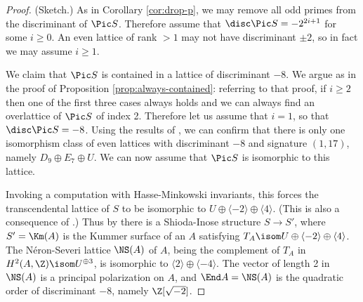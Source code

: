 \documentclass{article}
\begin{document}
\begin{proof} (Sketch.)  As in Corollary \ref{cor:drop-p}, we may remove all odd primes from the discriminant of $\Pic S$.  Therefore assume that $\disc \Pic S=-2^{2i+1}$ for some $i\geq 0$.  An even lattice of rank $>1$ may not have discriminant $\pm 2$, so in fact we may assume $i\geq 1$.  

We claim that $\Pic S$ is contained in a lattice of discriminant $-8$.   We argue as in the proof of Proposition \ref{prop:always-contained}:  referring to that proof, if $i\geq 2$ then one of the first three cases always holds and we can always find an overlattice of $\Pic S$ of index 2.   Therefore let us assume that $i=1$, so that $\disc \Pic S = -8$.   Using the results of \cite[Chapter 15]{SPLAG}, we can confirm that there is only one isomorphism class of even lattices with discriminant $-8$ and signature $(1,17)$, namely $D_9\oplus E_7\oplus U$.  We can now assume that $\Pic S$ is isomorphic to this lattice.

Invoking a computation with Hasse-Minkowski invariants, this forces the transcendental lattice of $S$ to be isomorphic to $U \oplus \langle -2 \rangle \oplus \langle 4 \rangle$.  (This is also a consequence of \cite[Proposition 7]{ElkiesKumar}.) Thus by \cite[Corollary 6.2]{morr} there is a Shioda-Inose structure $S\to S'$,  where $S'=\Km(A)$ is the Kummer surface of an $A$ satisfying $T_A\isom U\oplus \langle -2 \rangle \oplus \langle 4 \rangle$.   The N\'eron-Severi lattice  $\NS(A)$ of $A$, being the complement of $T_A$ in $H^2(A,\Z)\isom U^{\oplus 3}$, is isomorphic to $\langle 2 \rangle \oplus \langle -4 \rangle$.  The vector of length 2 in $\NS(A)$ is a principal polarization on $A$, and $\End A=\NS(A)$ is the quadratic order of discriminant $-8$, namely $\Z[\sqrt{-2}]$.


\end{proof}
\end{document}
